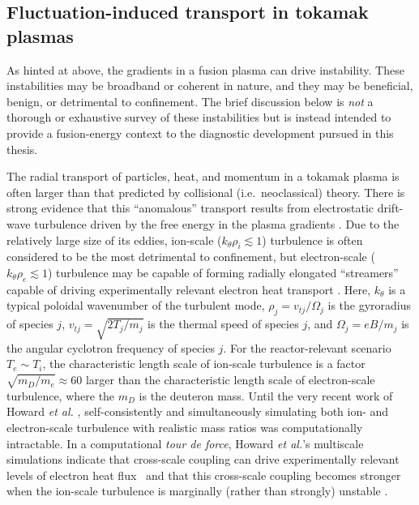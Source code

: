\subsection{Fluctuation-induced transport in tokamak plasmas}
As hinted at above, the gradients in a fusion plasma can drive instability.
These instabilities may be broadband or coherent in nature, and
they may be beneficial, benign, or detrimental to confinement.
The brief discussion below is \emph{not}
a thorough or exhaustive survey of these instabilities but
is instead intended to provide a fusion-energy context
to the diagnostic development pursued in this thesis.

The radial transport of particles, heat, and momentum in a tokamak plasma is
often larger than that predicted by collisional (i.e.\ neoclassical) theory.
There is strong evidence that this ``anomalous'' transport
results from electrostatic drift-wave turbulence
driven by the free energy in the plasma gradients
\cite{horton_drift_waves,tynan_ppcf09}.
Due to the relatively large size of its eddies,
ion-scale ($k_{\theta} \rho_i \lesssim 1$) turbulence is often considered
to be the most detrimental to confinement, but
electron-scale ($k_{\theta} \rho_e \lesssim 1$) turbulence
may be capable of forming radially elongated ``streamers''
\cite{dorland_prl00}
capable of driving experimentally relevant electron heat transport
\cite{jenko_prl02}.
Here, $k_{\theta}$ is a typical poloidal wavenumber of the turbulent mode,
$\rho_j = v_{tj} / \Omega_j$ is the gyroradius of species $j$,
$v_{tj} = \sqrt{2 T_j / m_j}$ is the thermal speed of species $j$, and
$\Omega_j = e B / m_j$ is the angular cyclotron frequency of species $j$.
For the reactor-relevant scenario $T_e \sim T_i$,
the characteristic length scale of ion-scale turbulence is a factor
$\sqrt{m_D / m_e} \approx 60$ larger than
the characteristic length scale of electron-scale turbulence,
where the $m_D$ is the deuteron mass.
Until the very recent work of Howard \emph{et al.}
\cite{howard_pp14,howard_nf16},
self-consistently and simultaneously simulating
both ion- and electron-scale turbulence with realistic mass ratios
was computationally intractable.
In a computational \emph{tour de force},
Howard \emph{et al.}'s multiscale simulations indicate
that cross-scale coupling can drive
experimentally relevant levels of electron heat flux~\cite{howard_pp14} and
that this cross-scale coupling becomes stronger
when the ion-scale turbulence is marginally (rather than strongly) unstable
\cite{howard_nf16}.

